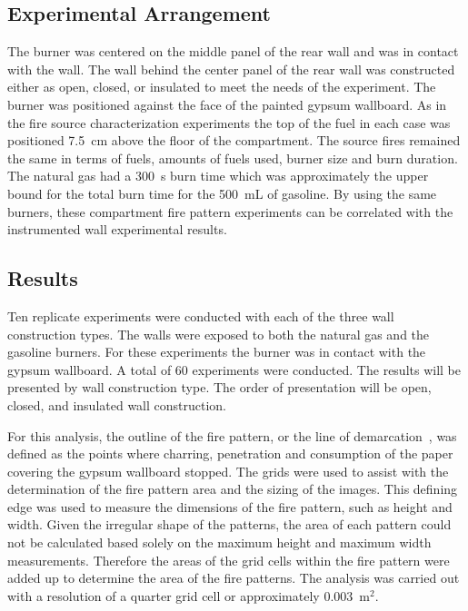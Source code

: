 \documentclass[twoside]{uocthesis}
\begin{document}
\subsection{Experimental Arrangement}

The burner was centered on the middle panel of the rear wall and was in contact with the wall. The wall behind the center panel of the rear wall was constructed either as open, closed, or insulated to meet the needs of the experiment. The burner was positioned against the face of the painted gypsum wallboard. As in the fire source characterization experiments the top of the fuel in each case was positioned 7.5~cm above the floor of the compartment. The source fires remained the same in terms of fuels, amounts of fuels used, burner size and burn duration.  The natural gas had a 300~s burn time which was approximately the upper bound for the total burn time for the 500~mL of gasoline.  By using the same burners, these compartment fire pattern experiments can be correlated with the instrumented wall experimental results.

\subsection{Results}

Ten replicate experiments were conducted with each of the three wall construction types.  The walls were exposed to both the natural gas and the gasoline burners.  For these experiments the burner was in contact with the gypsum wallboard.  A total of 60 experiments were conducted.  The results will be presented by wall construction type.  The order of presentation will be open, closed, and insulated wall construction.  

For this analysis, the outline of the fire pattern, or the line of demarcation~\cite{NFPA_921}, was defined as the points where charring, penetration and consumption of the paper covering the gypsum wallboard stopped. The grids were used to assist with the determination of the fire pattern area and the sizing of the images. This defining edge was used to measure the dimensions of the fire pattern, such as height and width. Given the irregular shape of the patterns, the area of each pattern could not be calculated based solely on the maximum height and maximum width measurements. Therefore the areas of the grid cells within the fire pattern were added up to determine the area of the fire patterns.  The analysis was carried out with a resolution of a quarter grid cell or approximately 0.003~m$^2$. 
\end{document}
